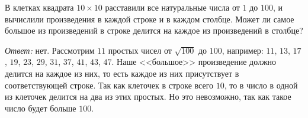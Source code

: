 В клетках квадрата $10 \times 10$ расставили все натуральные числа от $1$ до
$100$, и вычислили произведения в каждой строке и в каждом столбце.
Может ли самое большое из произведений в строке делится на каждое из
произведений в столбце?

\solution
\emph{Ответ:} нет.
Рассмотрим $11$ простых чисел от $\sqrt{100}$ до $100$, например:
$11$, $13$, $17$, $19$, $23$, $29$, $31$, $37$, $41$, $43$, $47$.
Наше <<большое>> произведение должно делится на каждое из них, то есть каждое из
них присутствует в соответствующей строке.
Так как клеточек в строке всего $10$, то в число в одной из клеточек делится на
два из этих простых.
Но это невозможно, так как такое число будет больше $100$.

